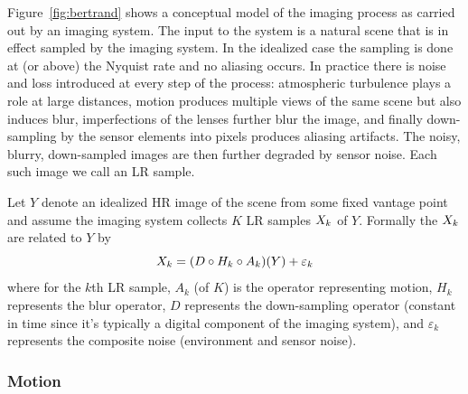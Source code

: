 Figure~\ref{fig:bertrand} shows a conceptual model of the imaging process as carried out by an imaging system.
%
The input to the system is a natural scene that is in effect sampled by the imaging system.
%
In the idealized case the sampling is done at (or above) the Nyquist rate and no aliasing occurs.
%
In practice there is noise and loss introduced at every step of the process: atmospheric turbulence plays a role at large distances, motion produces multiple views of the same scene but also induces blur, imperfections of the lenses further blur the image, and finally down-sampling by the sensor elements into pixels produces aliasing artifacts.
%
The noisy, blurry, down-sampled images are then further degraded by sensor noise.
%
Each such image we call an LR sample.

Let \(Y\) denote an idealized HR image of the scene from some fixed vantage point and assume the imaging system collects \(K\) LR samples \(X_k\) of \(Y\).
%
Formally the \(X_k\) are related to \(Y\) by
\begin{equation}
	X_k = (D \circ H_k \circ A_k) (Y) + \varepsilon_k
	\label{eqn:imagingmodel}
\end{equation}
where for the \(k\)th LR sample, \(A_k\) (of \(K\)) is the operator representing motion, \(H_k\) represents the blur operator, \(D\) represents the down-sampling operator (constant in time since it's typically a digital component of the imaging system), and \(\varepsilon_k\) represents the composite noise (environment and sensor noise).

\subsubsection{Motion}

